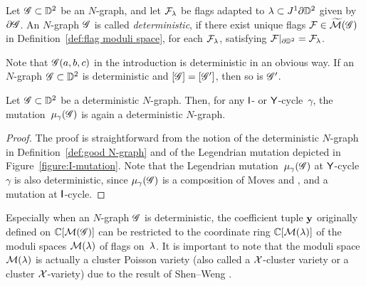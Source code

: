 \begin{definition}\label{def:good N-graph}
Let $\mathscr{G}\subset \mathbb{D}^2$ be an $N$-graph, and let $\mathcal{F}_\lambda$ be flags 
adapted to $\lambda\subset J^1\partial\mathbb{D}^2$ given by $\partial\mathscr{G}$.
An $N$-graph $\mathscr{G}$ is called \emph{deterministic}, if there exist unique flags $\mathcal{F}\in \widetilde{\mathcal{M}}(\mathscr{G})$ in Definition~\ref{def:flag moduli space}, for each $\mathcal{F}_\lambda$, satisfying $\mathcal{F}|_{\partial\mathbb{D}^2}=\mathcal{F}_\lambda$.
\end{definition}
Note that $\mathscr{G}(a,b,c)$ in the introduction is deterministic in an obvious way. 
If an $N$-graph $\mathscr{G}\subset \mathbb{D}^2$ is deterministic and $[\mathscr{G}]=[\mathscr{G}']$, then so is $\mathscr{G}'$.

\begin{proposition}\label{prop_mutation_preserves_deterministic}
Let $\mathscr{G}\subset \mathbb{D}^2$ be a deterministic $N$-graph.
Then, for any $\mathsf{I}$- or $\mathsf{Y}$-cycle~$\gamma$, the mutation~$\mu_\gamma(\mathscr{G})$ is again a deterministic $N$-graph.
\end{proposition}

\begin{proof}
The proof is straightforward from the notion of the deterministic $N$-graph in Definition~\ref{def:good N-graph} and of the Legendrian mutation depicted in Figure~\ref{figure:I-mutation}.
Note that the Legendrian mutation~$\mu_\gamma(\mathscr{G})$ at $\mathsf{Y}$-cycle $\gamma$ is also deterministic, since $\mu_\gamma(\mathscr{G})$ is a composition of Moves  and , and a mutation at $\mathsf{I}$-cycle.
\end{proof}


\begin{remark}\label{remark:Poisson variety}
Especially when an $N$-graph $\mathscr{G}$ is deterministic, 
the coefficient tuple $\mathbf{y}$ originally defined on $\mathbb{C}[\mathcal{M}(\mathscr{G})]$ can be restricted to the coordinate ring $\mathbb{C}[\mathcal{M}(\lambda)]$ of the moduli spaces $\mathcal{M}(\lambda)$ of flags on~$\lambda$.
It is important to note that the moduli space $\mathcal{M}(\lambda)$ is actually a cluster Poisson variety (also called a $\mathcal{X}$-cluster variety or a cluster $\mathcal{X}$-variety) due to the result of Shen--Weng \cite[Theorem~1.7]{SW2019}.
\end{remark}
